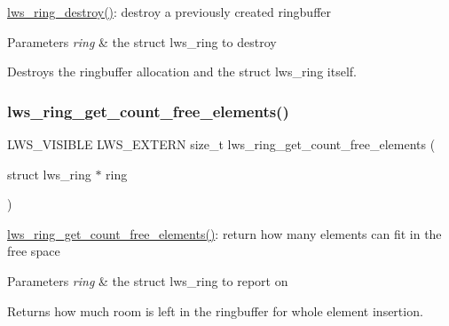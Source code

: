 \hyperlink{group__lws__ring_ga0e671dbbb18af91d23e78026d49bc6e2}{lws\+\_\+ring\+\_\+destroy()}\+: destroy a previously created ringbuffer


\begin{DoxyParams}{Parameters}
{\em ring} & the struct lws\+\_\+ring to destroy\\
\hline
\end{DoxyParams}
Destroys the ringbuffer allocation and the struct lws\+\_\+ring itself. \mbox{\label{group__lws__ring_ga711d92a1046c2a34860a2babd68aec32}} 
\subsubsection{\texorpdfstring{lws\+\_\+ring\+\_\+get\+\_\+count\+\_\+free\+\_\+elements()}{lws\_ring\_get\_count\_free\_elements()}}
{\footnotesize\ttfamily L\+W\+S\+\_\+\+V\+I\+S\+I\+B\+LE L\+W\+S\+\_\+\+E\+X\+T\+E\+RN size\+\_\+t lws\+\_\+ring\+\_\+get\+\_\+count\+\_\+free\+\_\+elements (\begin{DoxyParamCaption}\item[{struct lws\+\_\+ring $\ast$}]{ring }\end{DoxyParamCaption})}

\hyperlink{group__lws__ring_ga711d92a1046c2a34860a2babd68aec32}{lws\+\_\+ring\+\_\+get\+\_\+count\+\_\+free\+\_\+elements()}\+: return how many elements can fit in the free space


\begin{DoxyParams}{Parameters}
{\em ring} & the struct lws\+\_\+ring to report on\\
\hline
\end{DoxyParams}
Returns how much room is left in the ringbuffer for whole element insertion. \mbox{\label{group__lws__ring_ga5e3cb460d9af061b5b60dc35d4e2ea95}} 
